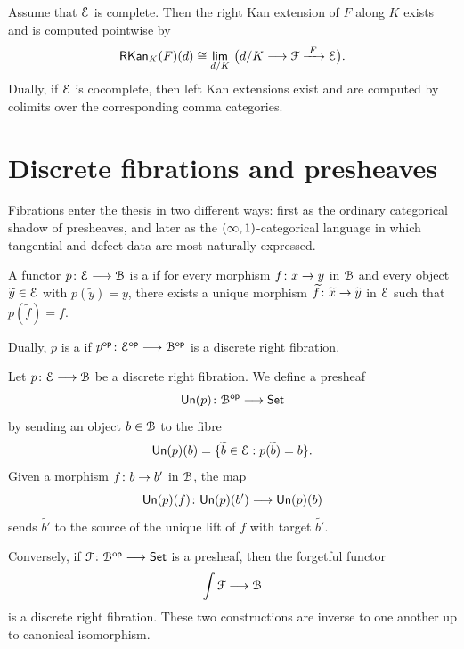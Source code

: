 \begin{theorem}\label{ap:: thm: right Kan extension pointwise}
    Assume that $\mathcal E$ is complete. Then the right Kan extension of $F$ along $K$ exists and is computed pointwise by
    \begin{equation}
        \rkan_{K}(F)(d)\cong \Limit[d/K]{\big(d/K \longra \cF \xra{\,\,F\,\,} \cE\big)}.
    \end{equation}
    Dually, if $\mathcal E$ is cocomplete, then left Kan extensions exist and are computed by colimits over the corresponding comma categories.
\end{theorem}

\section{Discrete fibrations and presheaves}

Fibrations enter the thesis in two different ways: first as the ordinary categorical shadow of presheaves, and later as the $(\operatorname{\infty},1)$-categorical language in which tangential and defect data are most naturally expressed.

\begin{definition}
    A functor $p\colon \mathcal E \longrightarrow \mathcal B$ is a  if for every morphism $f\colon x \to y$ in $\mathcal B$ and every object $\widetilde{y}\in \mathcal E$ with $p(\widetilde{y})=y$, there exists a unique morphism $\widetilde{f}\colon \widetilde{x}\to \widetilde{y}$ in $\mathcal E$ such that $p(\widetilde{f})=f$.

    \medskip

    \nid Dually, $p$ is a  if $p^{\mathsf{op}}\colon \mathcal E^{\mathsf{op}}\longrightarrow \mathcal B^{\mathsf{op}}$ is a discrete right fibration.
\end{definition}

\begin{construction}\label{ap:: cons: discrete fibration}
    Let $p\colon \mathcal E \longrightarrow \mathcal B$ be a discrete right fibration. We define a presheaf
    \begin{equation}
        \mathsf{Un}(p)\colon \mathcal B^{\mathsf{op}} \longrightarrow \operatorname{{\mathsf{Set}}}
    \end{equation}
    by sending an object $b\in \mathcal B$ to the fibre
    \begin{equation}
        \mathsf{Un}(p)(b)=\{\widetilde{b}\in \mathcal E : p(\widetilde{b})=b\}.
    \end{equation}
    Given a morphism $f\colon b\to b'$ in $\mathcal B$, the map
    \begin{equation}
        \mathsf{Un}(p)(f)\colon \mathsf{Un}(p)(b') \longrightarrow \mathsf{Un}(p)(b)
    \end{equation}
    sends $\widetilde{b'}$ to the source of the unique lift of $f$ with target $\widetilde{b'}$.

    \medskip

    \nid Conversely, if $\mathcal F\colon \mathcal B^{\mathsf{op}}\longrightarrow \operatorname{{\mathsf{Set}}}$ is a presheaf, then the forgetful functor
    \begin{equation}
        \int \mathcal F \longrightarrow \mathcal B
    \end{equation}
    is a discrete right fibration. These two constructions are inverse to one another up to canonical isomorphism.
\end{construction}

